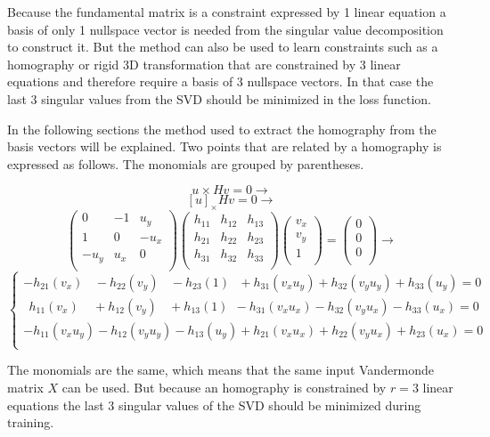 Because the fundamental matrix is a constraint expressed by 1 linear equation a basis of only 1  nullspace vector is needed from the singular value decomposition to construct it. But the method can also be used to learn constraints such as a homography or rigid 3D transformation that are constrained by 3 linear equations and therefore require a basis of 3 nullspace vectors. In that case the last 3 singular values from the SVD should be minimized in the loss function.

In the following sections the method used to extract the homography from the basis vectors will be explained. Two points that are related by a homography is expressed as follows. The monomials are grouped by parentheses.

\[
u \times Hv=0 \rightarrow
\]
\[
[u]_{\times} Hv=0 \rightarrow
\]
\[
\begin{pmatrix}
0 & -1 & u_y \\
1 & 0 & -u_x \\
-u_y & u_x & 0 \\
\end{pmatrix}
\begin{pmatrix}
h_{11} & h_{12} & h_{13} \\
h_{21} & h_{22} & h_{23} \\
h_{31} & h_{32} & h_{33} \\
\end{pmatrix}
\begin{pmatrix}
v_x \\
v_y \\
1 \\
\end{pmatrix}
=
\begin{pmatrix}
0 \\
0 \\
0 \\
\end{pmatrix}
\rightarrow
\]
\[
\begin{cases}
-h_{21} (v_x) \ \ \ \ - h_{22} (v_y) \ \ \ \ - h_{23} (1) \ \ \ + h_{31} (v_x u_y) + h_{32} (v_y u_y) + h_{33} (u_y) = 0 \\
\ \ h_{11} (v_x) \ \ \ \ \ + h_{12} (v_y) \ \ \ \ + h_{13} (1) \ \ -h_{31} (v_x u_x) -h_{32} (v_y u_x) - h_{33} (u_x) = 0 \\
-h_{11} (v_x u_y) -h_{12} (v_y u_y) -h_{13} (u_y) + h_{21} (v_x u_x) + h_{22} (v_y u_x) + h_{23} (u_x) = 0 \\
\end{cases}
\]

The monomials are the same, which means that the same input Vandermonde matrix $X$ can be used. But because an homography is constrained by $r=3$ linear equations the last 3 singular values of the SVD should be minimized during training.

